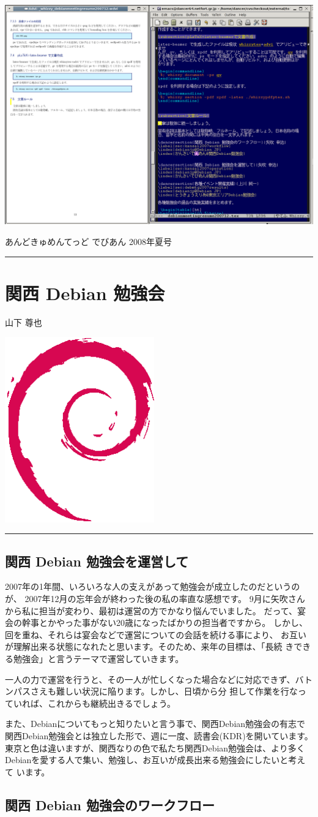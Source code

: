 \documentclass[mingoth,a4paper]{jsarticle}
\renewcommand{\dancersection}[2]{%
\newpage
あんどきゅめんてっど でびあん 2008年夏号
%
\vspace{0.1mm}\\
{\color{dancerlightblue}\rule{\hsize}{2mm}}

%
%
\begin{minipage}[t]{0.6\hsize}
\color{dancerdarkblue}
\vspace{1cm}
\section{#1}
\hfill{}#2\\
\end{minipage}
\begin{minipage}[t]{0.4\hsize}
\vspace{-2cm}
\hfill{}\includegraphics[height=8cm]{image200502/openlogo-nd.eps}\\
\vspace{-5cm}
\end{minipage}
%
%
{\color{dancerdarkblue}\rule{0.74\hsize}{2mm}}
%
\vspace{2cm}
}
\begin{document}
\includegraphics[width=1\hsize]{image200712/whizzytex.png}

\dancersection{関西 Debian 勉強会}{山下 尊也}
\label{sec:kansai2007operation}

\subsection{関西 Debian 勉強会を運営して}

2007年の1年間、いろいろな人の支えがあって勉強会が成立したのだというのが、
2007年12月の忘年会が終わった後の私の率直な感想です。
9月に矢吹さんから私に担当が変わり、最初は運営の方でかなり悩んでいました。
だって、宴会の幹事とかやった事がない20歳になったばかりの担当者ですから。
しかし、回を重ね、それらは宴会などで運営についての会話を続ける事により、
お互いが理解出来る状態になれたと思います。そのため、来年の目標は、「長続
きできる勉強会」と言うテーマで運営していきます。

一人の力で運営を行うと、その一人が忙しくなった場合などに対応できず、バト
ンパスさえも難しい状況に陥ります。しかし、日頃から分
担して作業を行なっていれば、これからも継続出きるでしょう。

また、Debianについてもっと知りたいと言う事で、関西Debian勉強会の有志で
関西Debian勉強会とは独立した形で、週に一度、読書会(KDR)を開いています。
東京と色は違いますが、関西なりの色で私たち関西Debian勉強会は、より多く
Debianを愛する人で集い、勉強し、お互いが成長出来る勉強会にしたいと考えて
います。

\subsection{関西 Debian 勉強会のワークフロー}
\end{document}
